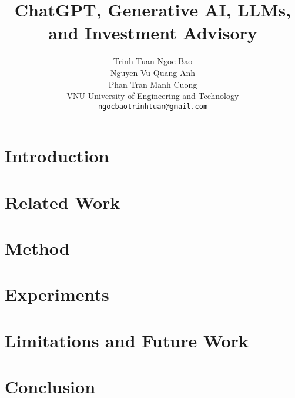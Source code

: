 \documentclass{article}
\title{ChatGPT, Generative AI, LLMs, and Investment
Advisory}
\author{
  Trinh Tuan Ngoc Bao \\
  Nguyen Vu Quang Anh \\
  Phan Tran Manh Cuong \\
  VNU University of Engineering and Technology\\
  \texttt{ngocbaotrinhtuan@gmail.com}
}
\begin{document}
\maketitle
\begin{abstract}
\end{abstract}

\section{Introduction}

\section{Related Work}

\section{Method}

\section{Experiments}

\section{Limitations and Future Work}


\section{Conclusion}

 
\end{document}
